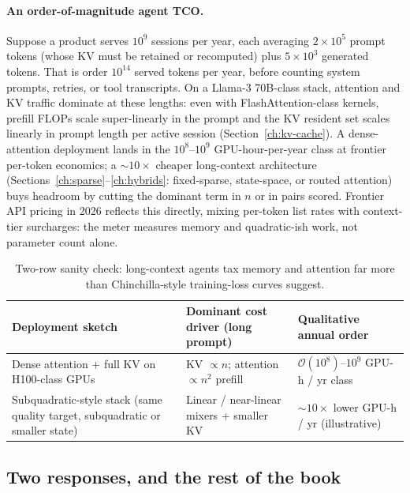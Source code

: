 \paragraph{An order-of-magnitude agent TCO.}
Suppose a product serves \(10^{9}\) sessions per year, each averaging
\(2\times 10^{5}\) prompt tokens (whose KV must be retained or recomputed)
plus \(5\times 10^{3}\) generated tokens. That is order
\(10^{14}\) served tokens per year, before counting system prompts,
retries, or tool transcripts. On a Llama-3 70B-class stack, attention and
KV traffic dominate at these lengths: even with FlashAttention-class
kernels, prefill FLOPs scale super-linearly in the prompt and the KV
resident set scales linearly in prompt length per active session
(Section~\ref{ch:kv-cache}). A dense-attention deployment lands in the
\(10^{8}\)--\(10^{9}\) GPU-hour-per-year class at frontier per-token
economics; a \(\sim 10\times\) cheaper long-context architecture
(Sections~\ref{ch:sparse}--\ref{ch:hybrids}: fixed-sparse, state-space, or routed attention) buys headroom by
cutting the dominant term in \(n\) or in pairs scored. Frontier API
pricing in 2026 reflects this directly, mixing per-token list rates with
context-tier surcharges: the meter measures memory and quadratic-ish
work, not parameter count alone.

\begin{table}[htbp]
\noindent
\small
\setlength{\tabcolsep}{4pt}
\begin{tabularx}{\linewidth}{@{} >{\raggedright\arraybackslash}X >{\raggedright\arraybackslash}X >{\raggedright\arraybackslash}X @{}}
\toprule
Deployment sketch & Dominant cost driver (long prompt) & Qualitative annual order \\
\midrule
Dense attention + full KV on H100-class GPUs & KV \(\propto n\); attention \(\propto n^{2}\) prefill & \(\mathcal{O}(10^{8})\)--\(10^{9}\) GPU-h / yr class \\
Subquadratic-style stack (same quality target, subquadratic or smaller state) & Linear / near-linear mixers + smaller KV & \(\sim 10\times\) lower GPU-h / yr (illustrative) \\
\bottomrule
\end{tabularx}
\caption{Two-row sanity check: long-context agents tax memory and attention far
more than Chinchilla-style training-loss curves suggest.}
\label{tab:agent-tco}
\end{table}

\subsection{Two responses, and the rest of the book}

